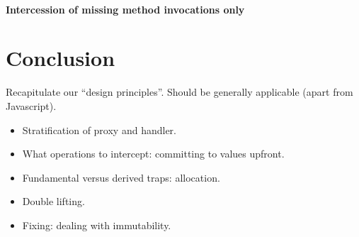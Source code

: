 \documentclass{acm_proc_article-sp}
\begin{document}
\paragraph{Intercession of missing method invocations only}




\section{Conclusion}

Recapitulate our ``design principles''. Should be generally applicable (apart from Javascript).
\begin{itemize}
  \item Stratification of proxy and handler.
  \item What operations to intercept: committing to values upfront.
  \item Fundamental versus derived traps: allocation.
  \item Double lifting.
  \item Fixing: dealing with immutability.
\end{itemize}



\end{document}
